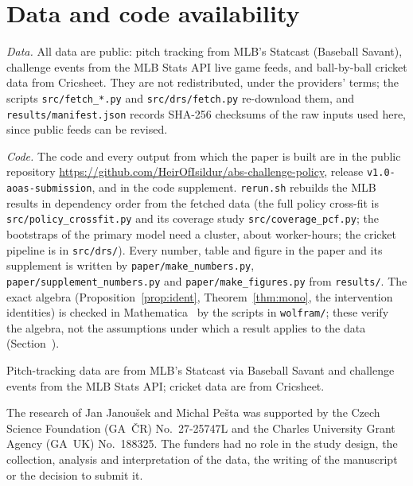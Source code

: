 \documentclass[aoas]{imsart}
\theoremstyle{plain}
\theoremstyle{definition}
\begin{document}
\section{Data and code availability}\label{sec:repro}

\emph{Data.} All data are public: pitch tracking from MLB's Statcast (Baseball Savant), challenge events from the MLB
Stats API live game feeds, and ball-by-ball cricket data from Cricsheet. They are not redistributed, under the
providers' terms; the scripts \nolinkurl{src/fetch_*.py} and \nolinkurl{src/drs/fetch.py} re-download them, and
\nolinkurl{results/manifest.json} records SHA-256 checksums of the raw inputs used here, since public feeds can be revised.

\emph{Code.} The code and every output from which the paper is built are in the public repository
\url{https://github.com/HeirOfIsildur/abs-challenge-policy}, release \nolinkurl{v1.0-aoas-submission}, and in the code
supplement. \nolinkurl{rerun.sh} rebuilds the MLB results in dependency order from the fetched data (the full policy
cross-fit is \nolinkurl{src/policy_crossfit.py} and its coverage study \nolinkurl{src/coverage_pcf.py}; the bootstraps of
the primary model need a cluster, about \GapBootHours{} worker-hours; the cricket pipeline is in \nolinkurl{src/drs/}).
Every number, table and figure in the paper and its supplement is written by \nolinkurl{paper/make_numbers.py},
\nolinkurl{paper/supplement_numbers.py} and \nolinkurl{paper/make_figures.py} from \nolinkurl{results/}. The exact algebra
(Proposition~\ref{prop:ident}, Theorem~\ref{thm:mono}, the intervention identities) is checked in
Mathematica~\ProofsVersion{} by the scripts in \nolinkurl{wolfram/}; these verify the algebra, not the assumptions under
which a result applies to the data (Section~).

\begin{acks}[Acknowledgments]
Pitch-tracking data are from MLB's Statcast via Baseball Savant and challenge events from the MLB Stats API; cricket
data are from Cricsheet.
\end{acks}

\begin{funding}
The research of Jan Janou\v{s}ek and Michal Pe\v{s}ta was supported by the Czech Science Foundation (GA~\v{C}R)
No.~27-25747L and the Charles University Grant Agency (GA~UK) No.~188325. The funders had no role in the study design,
the collection, analysis and interpretation of the data, the writing of the manuscript or the decision to submit it.
\end{funding}
\end{document}
